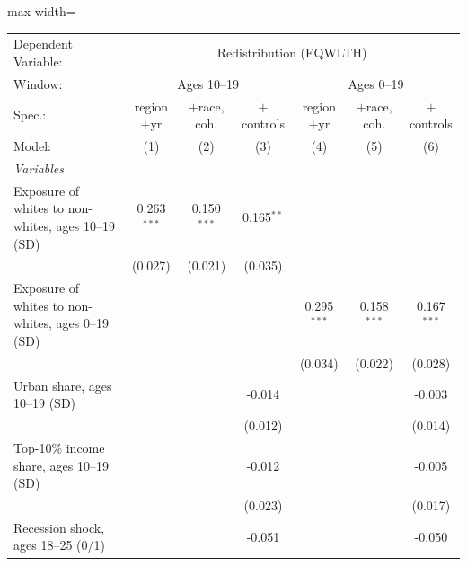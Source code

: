       \begin{adjustbox}{max width=\linewidth}
   \begin{tabular}{lcccccc}
      \tabularnewline \midrule \midrule
      Dependent Variable: & \multicolumn{6}{c}{Redistribution (EQWLTH)}\\
      Window: & \multicolumn{3}{c}{Ages 10--19} & \multicolumn{3}{c}{Ages 0--19} \\ 
      Spec.:                                             & region$+$yr   & $+$race, coh. & $+$controls  & region$+$yr   & $+$race, coh. & $+$controls \\   
      Model:                                             & (1)           & (2)           & (3)          & (4)           & (5)           & (6)\\  
      \midrule
      \emph{Variables}\\
      Exposure of whites to non-whites, ages 10--19 (SD) & 0.263$^{***}$ & 0.150$^{***}$ & 0.165$^{**}$ &               &               &   \\   
                                                         & (0.027)       & (0.021)       & (0.035)      &               &               &   \\   
      Exposure of whites to non-whites, ages 0--19 (SD)  &               &               &              & 0.295$^{***}$ & 0.158$^{***}$ & 0.167$^{***}$\\   
                                                         &               &               &              & (0.034)       & (0.022)       & (0.028)\\   
      Urban share, ages 10--19 (SD)                      &               &               & -0.014       &               &               & -0.003\\   
                                                         &               &               & (0.012)      &               &               & (0.014)\\   
      Top-10\% income share, ages 10--19 (SD)            &               &               & -0.012       &               &               & -0.005\\   
                                                         &               &               & (0.023)      &               &               & (0.017)\\   
      Recession shock, ages 18--25 (0/1)                 &               &               & -0.051       &               &               & -0.050\\   

\end{tabular}
\end{adjustbox}
